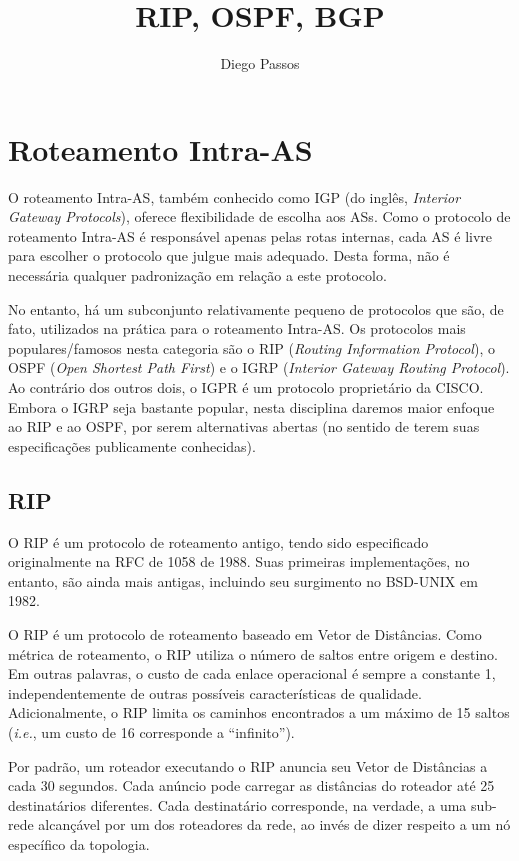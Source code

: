 \documentclass{article}
\title{RIP, OSPF, BGP}
\author{Diego Passos}
\begin{document}
\maketitle%

\section{Roteamento Intra-AS}

O roteamento Intra-AS, também conhecido como IGP (do inglês, \textit{Interior Gateway Protocols}), oferece flexibilidade de escolha aos ASs. Como o protocolo de roteamento Intra-AS é responsável apenas pelas rotas internas, cada AS é livre para escolher o protocolo que julgue mais adequado. Desta forma, não é necessária qualquer padronização em relação a este protocolo.

No entanto, há um subconjunto relativamente pequeno de protocolos que são, de fato, utilizados na prática para o roteamento Intra-AS. Os protocolos mais populares/famosos nesta categoria são o RIP (\textit{Routing Information Protocol}), o OSPF (\textit{Open Shortest Path First}) e o 
IGRP (\textit{Interior Gateway Routing Protocol}). Ao contrário dos outros dois, o IGPR é um protocolo proprietário da CISCO. Embora o IGRP seja bastante popular, nesta disciplina daremos maior enfoque ao RIP e ao OSPF, por serem alternativas abertas (no sentido de terem suas especificações publicamente conhecidas).

\subsection{RIP}

O RIP é um protocolo de roteamento antigo, tendo sido especificado originalmente na RFC de 1058 de 1988. Suas primeiras implementações, no entanto, são ainda mais antigas, incluindo seu surgimento no BSD-UNIX em 1982.

O RIP é um protocolo de roteamento baseado em Vetor de Distâncias. Como métrica de roteamento, o RIP utiliza o número de saltos entre origem e destino. Em outras palavras, o custo de cada enlace operacional é sempre a constante 1, independentemente de outras possíveis características de qualidade. Adicionalmente, o RIP limita os caminhos encontrados a um máximo de 15 saltos (\textit{i.e.}, um custo de 16 corresponde a ``infinito'').

Por padrão, um roteador executando o RIP anuncia seu Vetor de Distâncias a cada 30 segundos. Cada anúncio pode carregar as distâncias do roteador até 25 destinatários diferentes. Cada destinatário corresponde, na verdade, a uma sub-rede alcançável por um dos roteadores da rede, ao invés de dizer respeito a um nó específico da topologia.
\end{document}
